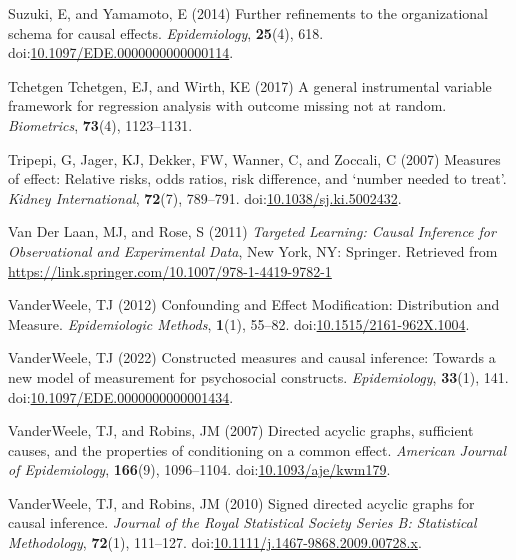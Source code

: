 \documentclass[
  single column]{article}
\newlength{\cslhangindent}
\newenvironment{CSLReferences}[2] %
 {\begin{list}{}{%
  \setlength{\itemindent}{0pt}
  \setlength{\leftmargin}{0pt}
  \setlength{\parsep}{0pt}
  \ifodd #1
   \setlength{\leftmargin}{\cslhangindent}
   \setlength{\itemindent}{-1\cslhangindent}
  \fi
  \setlength{\itemsep}{#2\baselineskip}}}
 {\end{list}}
\begin{document}
\begin{CSLReferences}{1}{0}
Suzuki, E, and Yamamoto, E (2014) Further refinements to the
organizational schema for causal effects. \emph{Epidemiology},
\textbf{25}(4), 618.
doi:\href{https://doi.org/10.1097/EDE.0000000000000114}{10.1097/EDE.0000000000000114}.

Tchetgen Tchetgen, EJ, and Wirth, KE (2017) A general instrumental
variable framework for regression analysis with outcome missing not at
random. \emph{Biometrics}, \textbf{73}(4), 1123--1131.

Tripepi, G, Jager, KJ, Dekker, FW, Wanner, C, and Zoccali, C (2007)
Measures of effect: Relative risks, odds ratios, risk difference, and
{`}number needed to treat{'}. \emph{Kidney International},
\textbf{72}(7), 789--791.
doi:\href{https://doi.org/10.1038/sj.ki.5002432}{10.1038/sj.ki.5002432}.

Van Der Laan, MJ, and Rose, S (2011) \emph{Targeted Learning: Causal
Inference for Observational and Experimental Data}, New York, NY:
Springer. Retrieved from
\url{https://link.springer.com/10.1007/978-1-4419-9782-1}

VanderWeele, TJ (2012) Confounding and Effect Modification: Distribution
and Measure. \emph{Epidemiologic Methods}, \textbf{1}(1), 55--82.
doi:\href{https://doi.org/10.1515/2161-962X.1004}{10.1515/2161-962X.1004}.

VanderWeele, TJ (2022) Constructed measures and causal inference:
Towards a new model of measurement for psychosocial constructs.
\emph{Epidemiology}, \textbf{33}(1), 141.
doi:\href{https://doi.org/10.1097/EDE.0000000000001434}{10.1097/EDE.0000000000001434}.

VanderWeele, TJ, and Robins, JM (2007) Directed acyclic graphs,
sufficient causes, and the properties of conditioning on a common
effect. \emph{American Journal of Epidemiology}, \textbf{166}(9),
1096--1104.
doi:\href{https://doi.org/10.1093/aje/kwm179}{10.1093/aje/kwm179}.

VanderWeele, TJ, and Robins, JM (2010) Signed directed acyclic graphs
for causal inference. \emph{Journal of the Royal Statistical Society
Series B: Statistical Methodology}, \textbf{72}(1), 111--127.
doi:\href{https://doi.org/10.1111/j.1467-9868.2009.00728.x}{10.1111/j.1467-9868.2009.00728.x}.


\end{CSLReferences}
\end{document}
